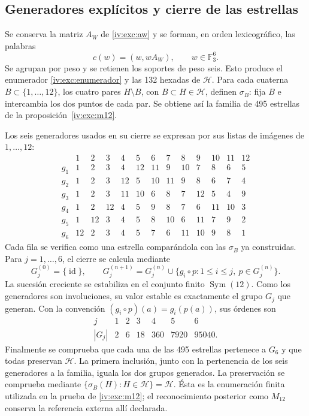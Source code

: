 \subsection{Generadores explícitos y cierre de las estrellas}
\label{iv:iv:apendice-estrellas}

Se conserva la matriz \(A_W\) de \eqref{iv:exc:aw} y se forman,
en orden lexicográfico, las palabras
\[
 c(w)=(w,wA_W),\qquad w\in\mathbb F_3^6.
\]
Se agrupan por peso y se retienen los soportes de peso seis.
Esto produce el enumerador \eqref{iv:exc:enumerador} y las 132 hexadas
de \(\mathcal H\). Para cada cuaterna \(B\subset\{1,\ldots,12\}\),
los cuatro pares \(H\setminus B\), con \(B\subset H\in\mathcal H\),
definen \(\sigma_B\): fija \(B\) e intercambia los dos puntos
de cada par. Se obtiene así la familia de 495 estrellas de
la proposición~\ref{iv:exc:m12}.

Los seis generadores usados en su cierre se expresan por sus listas
de imágenes de \(1,\ldots,12\):
\[
\begin{array}{c|rrrrrrrrrrrr}
 &1&2&3&4&5&6&7&8&9&10&11&12\\ \hline
g_1&1&2&3&4&12&11&9&10&7&8&6&5\\
g_2&1&2&3&12&5&10&11&9&8&6&7&4\\
g_3&1&2&3&11&10&6&8&7&12&5&4&9\\
g_4&1&2&12&4&5&9&8&7&6&11&10&3\\
g_5&1&12&3&4&5&8&10&6&11&7&9&2\\
g_6&12&2&3&4&5&7&6&11&10&9&8&1
\end{array}
\]
Cada fila se verifica como una estrella comparándola con las
\(\sigma_B\) ya construidas. Para \(j=1,\ldots,6\), el cierre
se calcula mediante
\[
 G_j^{(0)}=\{\operatorname{id}\},\qquad
 G_j^{(n+1)}
 =G_j^{(n)}\cup
   \{g_i\circ p:1\leq i\leq j,\ p\in G_j^{(n)}\}.
\]
La sucesión creciente se estabiliza en el conjunto finito
\(\operatorname{Sym}(12)\). Como los generadores son involuciones,
su valor estable es exactamente el grupo \(G_j\) que generan.
Con la convención \((g_i\circ p)(a)=g_i(p(a))\), sus órdenes son
\[
\begin{array}{c|rrrrrr}
 j&1&2&3&4&5&6\\ \hline
 |G_j|&2&6&18&360&7920&95040 .
\end{array}
\]
Finalmente se comprueba que cada una de las 495 estrellas pertenece
a \(G_6\) y que todas preservan \(\mathcal H\). La primera inclusión,
junto con la pertenencia de los seis generadores a la familia,
iguala los dos grupos generados. La preservación se comprueba
mediante \(\{\sigma_B(H):H\in\mathcal H\}=\mathcal H\).
Ésta es la enumeración finita utilizada en la prueba de
\ref{iv:exc:m12}; el reconocimiento posterior como \(M_{12}\)
conserva la referencia externa allí declarada.

